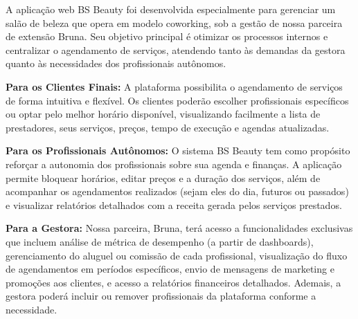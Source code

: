 A aplicação web BS Beauty foi desenvolvida especialmente para gerenciar um salão de beleza que opera em modelo coworking, sob a gestão de nossa parceira de extensão Bruna. Seu objetivo principal é otimizar os processos internos e centralizar o agendamento de serviços, atendendo tanto às demandas da gestora quanto às necessidades dos profissionais autônomos.

\noindent\textbf{Para os Clientes Finais:} A plataforma possibilita o agendamento de serviços de forma intuitiva e flexível. Os clientes poderão escolher profissionais específicos ou optar pelo melhor horário disponível, visualizando facilmente a lista de prestadores, seus serviços, preços, tempo de execução e agendas atualizadas.

\noindent\textbf{Para os Profissionais Autônomos:} O sistema BS Beauty tem como propósito reforçar a autonomia dos profissionais sobre sua agenda e finanças. A aplicação permite bloquear horários, editar preços e a duração dos serviços, além de acompanhar os agendamentos realizados (sejam eles do dia, futuros ou passados) e visualizar relatórios detalhados com a receita gerada pelos serviços prestados.

\noindent\textbf{Para a Gestora:} Nossa parceira, Bruna, terá acesso a funcionalidades exclusivas que incluem análise de métrica de desempenho (a partir de dashboards), gerenciamento do aluguel ou comissão de cada profissional, visualização do fluxo de agendamentos em períodos específicos, envio de mensagens de marketing e promoções aos clientes, e acesso a relatórios financeiros detalhados. Ademais, a gestora poderá incluir ou remover profissionais da plataforma conforme a necessidade.